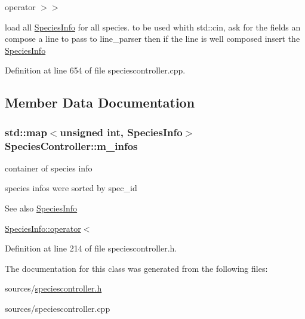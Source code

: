 operator $>$$>$ 

load all \hyperlink{structSpeciesInfo}{SpeciesInfo} for all species. to be used whith std::cin, ask for the fields an compose a line to pass to line\_\-parser then if the line is well composed insert the \hyperlink{structSpeciesInfo}{SpeciesInfo} 

Definition at line 654 of file speciescontroller.cpp.



\subsection{Member Data Documentation}
\hypertarget{classSpeciesController_a4e439ccd41d6143680b7a89bd985c8ad}{
\subsubsection[{m\_\-infos}]{\setlength{\rightskip}{0pt plus 5cm}std::map$<$unsigned int, {\bf SpeciesInfo}$>$ {\bf SpeciesController::m\_\-infos}}}
\label{classSpeciesController_a4e439ccd41d6143680b7a89bd985c8ad}


container of species info 

species infos were sorted by spec\_\-id \begin{DoxySeeAlso}{See also}
\hyperlink{structSpeciesInfo}{SpeciesInfo} 

\hyperlink{structSpeciesInfo_ab9716bf0081511ea866d49e173bd0554}{SpeciesInfo::operator$<$} 
\end{DoxySeeAlso}


Definition at line 214 of file speciescontroller.h.



The documentation for this class was generated from the following files:\begin{DoxyCompactItemize}
\item 
sources/\hyperlink{speciescontroller_8h}{speciescontroller.h}\item 
sources/speciescontroller.cpp\end{DoxyCompactItemize}
